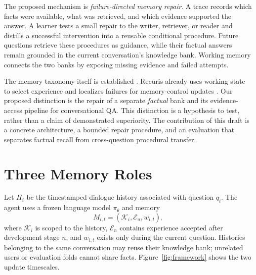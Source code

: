 \documentclass{article}
\newcommand{\KB}{\mathcal{K}}
\newcommand{\EB}{\mathcal{E}}
\newcommand{\WM}{w}
\newcommand{\Model}{\pi_{\theta}}
\begin{document}
The proposed mechanism is \emph{failure-directed memory repair}. A trace records
which facts were available, what was retrieved, and which evidence supported the
answer. A learner tests a small repair to the writer, retriever, or reader and
distills a successful intervention into a reusable conditional procedure.
Future questions retrieve these procedures as guidance, while their factual
answers remain grounded in the current conversation's knowledge bank. Working
memory connects the two banks by exposing missing evidence and failed attempts.

The memory taxonomy itself is established \citep{langmem}. Recuris already uses
working state to select experience and localizes failures for memory-control
updates \citep{recuris}. Our proposed distinction is the repair of a separate
\emph{factual} bank and its evidence-access pipeline for conversational QA. This
distinction is a hypothesis to test, rather than a claim of demonstrated
superiority. The contribution of this draft is a concrete architecture, a
bounded repair procedure, and an evaluation that separates factual recall from
cross-question procedural transfer.

\section{Three Memory Roles}
\label{sec:method}
Let $H_i$ be the timestamped dialogue history associated with question $q_i$.
The agent uses a frozen language model $\Model$ and memory
\begin{equation}
    M_{i,t}=(\KB_i,\EB_n,\WM_{i,t}),
\end{equation}
where $\KB_i$ is scoped to the history, $\EB_n$ contains experience accepted
after development stage $n$, and $\WM_{i,t}$ exists only during the current
question. Histories belonging to the same conversation may reuse their
knowledge bank; unrelated users or evaluation folds cannot share facts.
Figure~\ref{fig:framework} shows the two update timescales.
\end{document}
